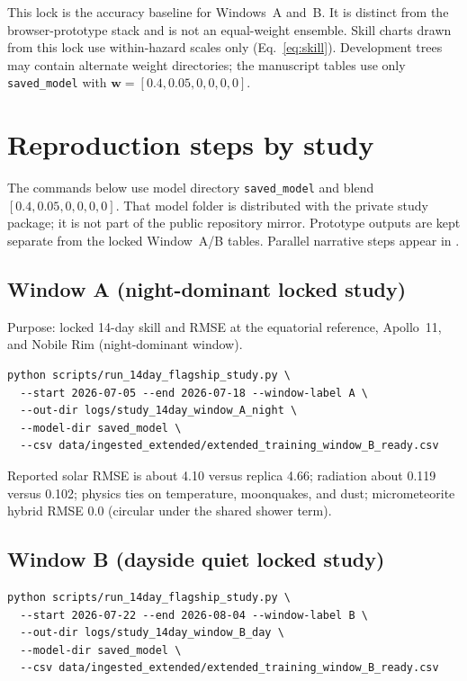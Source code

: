 This lock is the accuracy baseline for Windows~A and~B. It is distinct from the browser-prototype stack and is not an equal-weight ensemble. Skill charts drawn from this lock use within-hazard scales only (Eq.~\eqref{eq:skill}). Development trees may contain alternate weight directories; the manuscript tables use only \texttt{saved\_model} with $\mathbf{w}=[0.4,0.05,0,0,0,0]$.

\section{Reproduction steps by study}
\label{app:D}

The commands below use model directory \texttt{saved\_model} and blend $[0.4,0.05,0,0,0,0]$. That model folder is distributed with the private study package; it is not part of the public repository mirror. Prototype outputs are kept separate from the locked Window~A/B tables. Parallel narrative steps appear in .

\subsection*{Window A (night-dominant locked study)}

Purpose: locked 14-day skill and RMSE at the equatorial reference, Apollo~11, and Nobile Rim (night-dominant window).

\begin{verbatim}
python scripts/run_14day_flagship_study.py \
  --start 2026-07-05 --end 2026-07-18 --window-label A \
  --out-dir logs/study_14day_window_A_night \
  --model-dir saved_model \
  --csv data/ingested_extended/extended_training_window_B_ready.csv
\end{verbatim}

Reported solar RMSE is about 4.10 versus replica 4.66; radiation about 0.119 versus 0.102; physics ties on temperature, moonquakes, and dust; micrometeorite hybrid RMSE 0.0 (circular under the shared shower term).

\subsection*{Window B (dayside quiet locked study)}

\begin{verbatim}
python scripts/run_14day_flagship_study.py \
  --start 2026-07-22 --end 2026-08-04 --window-label B \
  --out-dir logs/study_14day_window_B_day \
  --model-dir saved_model \
  --csv data/ingested_extended/extended_training_window_B_ready.csv
\end{verbatim}

